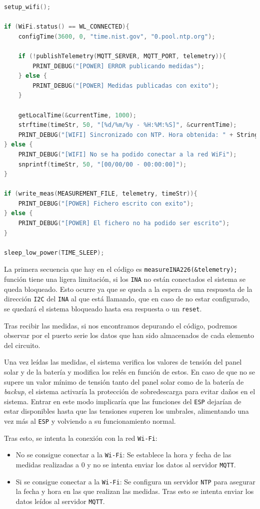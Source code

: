 \begin{itemize}
\begin{lstlisting}[captionpos=b, caption={Codigo de la funcion \texttt{loop}}, language=c++]
setup_wifi();

if (WiFi.status() == WL_CONNECTED){
    configTime(3600, 0, "time.nist.gov", "0.pool.ntp.org");
    
    if (!publishTelemetry(MQTT_SERVER, MQTT_PORT, telemetry)){
        PRINT_DEBUG("[POWER] ERROR publicando medidas");
    } else {
        PRINT_DEBUG("[POWER] Medidas publicadas con exito");
    }

    getLocalTime(&currentTime, 1000);
    strftime(timeStr, 50, "[%d/%m/%y - %H:%M:%S]", &currentTime);
    PRINT_DEBUG("[WIFI] Sincronizado con NTP. Hora obtenida: " + String(timeStr));
} else {
    PRINT_DEBUG("[WIFI] No se ha podido conectar a la red WiFi");
    snprintf(timeStr, 50, "[00/00/00 - 00:00:00]");
}

if (write_meas(MEASUREMENT_FILE, telemetry, timeStr)){
    PRINT_DEBUG("[POWER] Fichero escrito con exito");
} else {
    PRINT_DEBUG("[POWER] El fichero no ha podido ser escrito");
}

sleep_low_power(TIME_SLEEP);
\end{lstlisting}

La primera secuencia que hay en el código es \texttt{measureINA226(\&telemetry);} función tiene una ligera limitación, si los \texttt{INA} no están conectados el sistema se queda bloqueado.
Esto ocurre ya que se queda a la espera de una respuesta de la dirección \texttt{I2C} del \texttt{INA} al que está llamando, que en caso de no estar configurado, se quedará el sistema bloqueado hasta esa respuesta o un \texttt{reset}.

Tras recibir las medidas, si nos encontramos depurando el código, podremos observar por el puerto serie los datos que han sido almacenados de cada elemento del circuito.

Una vez leídas las medidas, el sistema verifica los valores de tensión del panel solar y de la batería y modifica los relés en función de estos.
En caso de que no se supere un valor mínimo de tensión tanto del panel solar como de la batería de \textit{backup}, el sistema activaría la protección de sobredescarga para evitar daños en el sistema. 
Entrar en este modo implicaría que las funciones del \texttt{ESP} dejarían de estar disponibles hasta que las tensiones superen los umbrales, alimentando una vez más al \texttt{ESP} y volviendo a su funcionamiento normal.

Tras esto, se intenta la conexión con la red \texttt{Wi-Fi}:
\begin{itemize}
    \item No se consigue conectar a la \texttt{Wi-Fi}: Se establece la hora y fecha de las medidas realizadas a 0 y no se intenta enviar los datos al servidor \texttt{MQTT}. 
    \item Si se consigue conectar a la \texttt{Wi-Fi}: Se configura un servidor \texttt{NTP} para asegurar la fecha y hora en las que realizan las medidas. Tras esto se intenta enviar los datos leídos al servidor \texttt{MQTT}.
\end{itemize}


\end{itemize}
